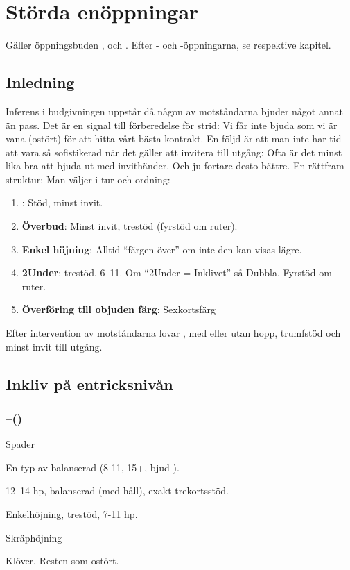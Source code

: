 \chapter{Störda en{\"o}ppningar}

Gäller öppningsbuden ,  och . Efter - och
-öppningarna, se respektive kapitel.
 
\section{Inledning}

Inferens i budgivningen uppstår då någon av motståndarna bjuder något annat
än pass. Det är en signal till 
förberedelse för strid: Vi får inte bjuda som vi är vana (ostört) för att
hitta vårt bästa kontrakt. 
En följd är att man inte har tid att vara så sofistikerad när det gäller
att invitera till utgång: Ofta är det 
minst lika bra att bjuda ut med invithänder. Och ju fortare desto bättre.
En rättfram struktur: Man väljer i tur och ordning:
\begin{enumerate}
\item {}: Stöd, minst invit.
\item {\bf Överbud}: Minst invit, trestöd (fyrstöd om ruter).
\item {\bf Enkel höjning}: Alltid “färgen över” om inte den kan visas lägre.
\item {\bf 2Under}: trestöd, 6–11. Om “2Under = Inklivet” så
  Dubbla. Fyrstöd om ruter. 
\item {\bf Överföring till objuden färg}: Sexkortsfärg
\end{enumerate}

Efter intervention av motståndarna lovar , med eller utan hopp,
trumf\-stöd och minst invit till utgång.


\section{Inkliv på entricksnivån}


\subsection{--()}

\bbe
\item[D] Spader
\item[\spa{1}] En typ av balanserad (8-11, 15+, bjud ).
\item[\NT{1}] 12--14 hp, balanserad (med håll), exakt trekortsstöd.
\item[\kl{2}] Enkelhöjning, trestöd, 7-11 hp.
\item[\ru{2}] Skräphöjning
\item[\hj{2}] Klöver.
\ebe
Resten som ostört.

